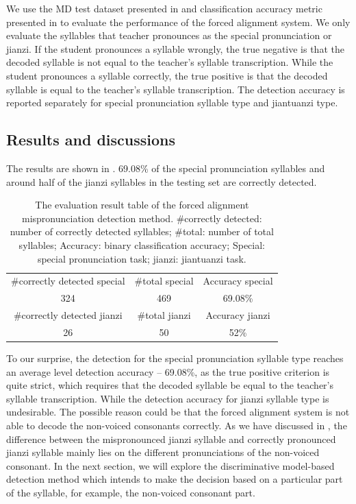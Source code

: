 We use the MD test dataset presented in  and classification accuracy metric presented in  to evaluate the performance of the forced alignment system. We only evaluate the syllables that teacher pronounces as the special pronunciation or jianzi. If the student pronounces a syllable wrongly, the true negative is that the decoded syllable is not equal to the teacher's syllable transcription. While the student pronounces a syllable correctly, the true positive is that the decoded syllable is equal to the teacher's syllable transcription. The detection accuracy is reported separately for special pronunciation syllable type and jiantuanzi type.

\subsection{Results and discussions}

The results are shown in . 69.08\% of the special pronunciation syllables and around half of the jianzi syllables in the testing set are correctly detected.

\begin{table}[ht!]
\centering
\caption{The evaluation result table of the forced alignment mispronunciation detection method. \#correctly detected: number of correctly detected syllables; \#total: number of total syllables; Accuracy: binary classification accuracy; Special: special pronunciation task; jianzi: jiantuanzi task.}
\label{tab:ch6:forced_alignment_results}
\begin{tabular}{ccc}
\toprule
\#correctly detected special & \#total special & Accuracy special \\
324 & 469 & 69.08\% \\
\midrule
\#correctly detected jianzi & \#total jianzi & Accuracy jianzi \\
26 & 50 & 52\% \\
\bottomrule
\end{tabular}
\end{table}

To our surprise, the detection for the special pronunciation syllable type reaches an average level detection accuracy -- 69.08\%, as the true positive criterion is quite strict, which requires that the decoded syllable be equal to the teacher's syllable transcription. While the detection accuracy for jianzi syllable type is undesirable. The possible reason could be that the forced alignment system is not able to decode the non-voiced consonants correctly. As we have discussed in , the difference between the mispronounced jianzi syllable and correctly pronounced jianzi syllable mainly lies on the different pronunciations of the non-voiced consonant. In the next section, we will explore the discriminative model-based detection method which intends to make the decision based on a particular part of the syllable, for example, the non-voiced consonant part.


